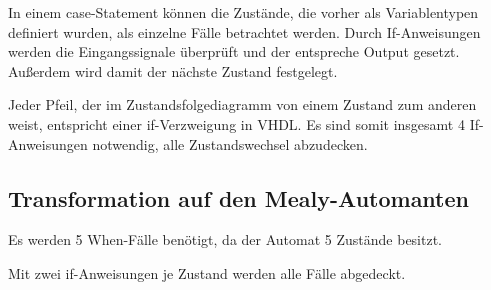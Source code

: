 \documentclass[
    paper=a4,
    parskip=half,
]{scrartcl}
\begin{document}
        In einem case-Statement können die Zustände, die vorher als Variablentypen definiert wurden, als einzelne Fälle betrachtet werden. Durch If-Anweisungen werden die Eingangssignale überprüft und der entspreche Output gesetzt. Außerdem wird damit der nächste Zustand festgelegt.

        Jeder Pfeil, der im Zustandsfolgediagramm von einem Zustand zum anderen weist, entspricht einer if-Verzweigung in VHDL. Es sind somit insgesamt 4 If-Anweisungen notwendig, alle Zustandswechsel abzudecken.

    \subsection{Transformation auf den Mealy-Automanten}
        Es werden 5 When-Fälle benötigt, da der Automat 5 Zustände besitzt.

        Mit zwei if-Anweisungen je Zustand werden alle Fälle abgedeckt.
\end{document}
